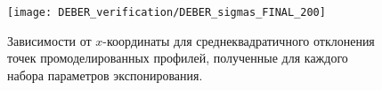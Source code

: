 \begin{figure}[t]
	\begin{center}
		\texttt{[image: DEBER\_verification/DEBER\_sigmas\_FINAL\_200]}
	\end{center}
	\vspace{-1em}
	\caption{Зависимости от $x$-координаты для среднеквадратичного отклонения точек промоделированных профилей, полученные для каждого набора параметров экспонирования.}
	\label{fig:DEBER_sigmas}
	\vspace{1em}
\end{figure}
